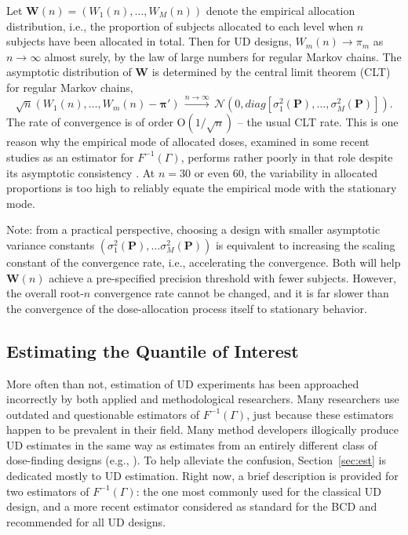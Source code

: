 Let $\mathbf{W}(n)=\left(W_1(n),\ldots ,W_M(n)\right)$ denote the empirical allocation distribution, i.e., the proportion of subjects allocated to each level when $n$ subjects have been allocated in total. Then for UD designs, $W_m(n)\to\pi_m$ as $n\rightarrow \infty$ almost surely, by the law of large numbers for regular Markov chains. The asymptotic distribution of $\mathbf{W}$ is determined by the central limit theorem (CLT) for regular Markov chains,
%
\begin{equation}\label{eq:CLT}
\sqrt{n}\left(W_1(n),\ldots, W_m(n)-\boldsymbol{\pi}\prime\right)\,\stackrel{n
\rightarrow \infty}{\longrightarrow}
\,\mathcal{N}\left(0,diag\left[\sigma_1^2(\mathbf{P})
,\ldots ,\sigma_M^2(\mathbf{P})\right] \right).
\end{equation}
%
The rate of convergence is of order $\mathrm{O}\left(1/\sqrt{n}\right)$ -- the usual CLT rate. This is one reason why the empirical mode of allocated doses, examined in some recent studies as an estimator for $F^{-1}(\Gamma)$, performs rather poorly in that role despite its asymptotic consistency \citep{Giov:Pint:Pint:prop:1998}. At $n=30$ or even $60$, the variability in allocated proportions is too high to reliably equate the empirical mode with the stationary mode.

Note: from a practical perspective, choosing a design with smaller asymptotic variance constants $\left(\sigma_1^2(\mathbf{P}),\ldots\sigma_M^2(\mathbf{P})\right)$ is equivalent to increasing the scaling constant of the convergence rate, i.e., accelerating the convergence. Both will help $\mathbf{W}(n)$ achieve a pre-specified precision threshold with fewer subjects. However, the overall root-$n$ convergence rate cannot be changed, and it is far slower than the convergence of the dose-allocation process itself to stationary behavior.

\subsection{Estimating the Quantile of Interest}

More often than not, estimation of UD experiments has been approached incorrectly by both applied and methodological researchers. Many researchers use outdated and questionable estimators of $F^{-1}(\Gamma)$, just because these estimators happen to be prevalent in their field. Many method developers illogically produce  UD estimates  in the same way as estimates from an entirely different class of dose-finding designs (e.g., \cite{Zack:stag:2009}). To help alleviate the confusion, Section~\ref{sec:est} is dedicated mostly to UD estimation. Right now, a brief description is provided for two  estimators of $F^{-1}(\Gamma)$: the one most commonly used for the classical UD design, and a more recent estimator considered as standard for the BCD and recommended for all UD designs.

